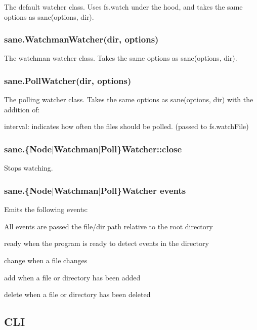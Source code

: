 The default watcher class. Uses {\ttfamily fs.\+watch} under the hood, and takes the same options as {\ttfamily sane(options, dir)}.

\subsubsection*{sane.\+Watchman\+Watcher(dir, options)}

The watchman watcher class. Takes the same options as {\ttfamily sane(options, dir)}.

\subsubsection*{sane.\+Poll\+Watcher(dir, options)}

The polling watcher class. Takes the same options as {\ttfamily sane(options, dir)} with the addition of\+:


\begin{DoxyItemize}
\item interval\+: indicates how often the files should be polled. (passed to fs.\+watch\+File)
\end{DoxyItemize}

\subsubsection*{sane.\{Node$\vert$\+Watchman$\vert$\+Poll\}Watcher\+::close}

Stops watching.

\subsubsection*{sane.\{Node$\vert$\+Watchman$\vert$\+Poll\}Watcher events}

Emits the following events\+:

All events are passed the file/dir path relative to the root directory
\begin{DoxyItemize}
\item {\ttfamily ready} when the program is ready to detect events in the directory
\item {\ttfamily change} when a file changes
\item {\ttfamily add} when a file or directory has been added
\item {\ttfamily delete} when a file or directory has been deleted
\end{DoxyItemize}

\subsection*{C\+LI}

